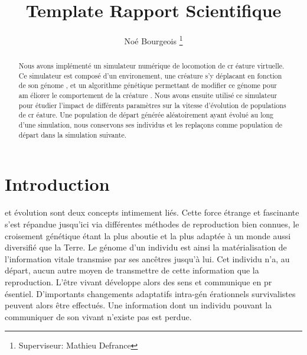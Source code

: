\documentclass[journal, a4paper]{IEEEtran}
\begin{document}
	\title{Template Rapport Scientifique}
	\author{Noé Bourgeois
	\thanks{Superviseur: Mathieu Defrance}}
	\maketitle

\begin{abstract}
	Nous avons implémenté un simulateur numérique de locomotion de cr
	éature virtuelle. Ce simulateur est
	composé d'un environement, une créature s'y déplacant en fonction
	de son génome
	, et
	un
	algorithme génétique permettant de modifier ce génome pour am
	éliorer le comportement de la créature
	.
	Nous avons ensuite utilisé ce simulateur pour étudier l'impact de
	différents paramètres sur la vitesse d'évolution de populations
	de cr
	éature.
	Une population de départ générée aléatoirement ayant évolué au long
	d'une
	simulation, nous conservons ses individus et les replaçons comme population de départ
	dans la simulation suivante.
\end{abstract}

\section{Introduction}
	 et évolution sont deux concepts intimement liés.
	Cette force étrange et fascinante s'est répandue jusqu'ici via
	différentes méthodes de reproduction bien connues, le croisement
	génétique étant la plus aboutie et la plus adaptée à un monde aussi
	diversifié que la Terre.
	Le génome d'un individu est ainsi la matérialisation de
	l'information vitale transmise par ses ancêtres jusqu'à lui.
	Cet individu n'a, au départ, aucun autre moyen de transmettre de
	cette information que la reproduction.
	L'être vivant développe alors des sens et communique en pr
	ésentiel. D'importants changements adaptatifs intra-gén
	érationnels survivalistes peuvent alors être effectués. Une information
	dont un individu pouvant la communiquer de son vivant n'existe
	pas est perdue.
\end{document}
